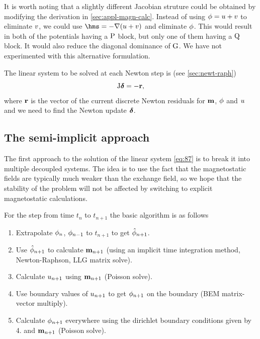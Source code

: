 It is worth noting that a slightly different Jacobian struture could be obtained by modifying the derivation in \cref{sec:appl-magn-calc}.
Instead of using $\phi = u + v$ to eliminate $v$, we could use $\hms = - \grad ( \phione + \phitwo)$ and eliminate $\phi$.
This would result in both of the potentials having a $\mathrm{P}$ block, but only one of them having a $\mathrm{Q}$ block.
It would also reduce the diagonal dominance of ${\mathbf{\mathrm{G}}}$.
We have not experimented with this alternative formulation.

The linear system to be solved at each Newton step is (see \cref{sec:newt-raph})
\begin{equation}
  \mathrm{J} \boldsymbol{\mathrm{\delta}} = -\boldsymbol{\mathrm{r}},
  \label{eq:87}
\end{equation}
where $\boldsymbol{\mathrm{r}}$ is the vector of the current discrete Newton residuals for $\boldsymbol{\mathrm{m}}$, $\phi$ and $u$ and we need to find the Newton update $\boldsymbol{\mathrm{\delta}}$.


\subsection{The semi-implicit approach}
\label{sec:semi-implicit-bem}

The first approach to the solution of the linear system \cref{eq:87} is to break it into multiple decoupled systems.
The idea is to use the fact that the magnetostatic fields are typically much weaker than the exchange field, so we hope that the stability of the problem will not be affected by switching to explicit magnetostatic calculations.


For the step from time $t_n$ to $t_{n+1}$ the basic algorithm is as follows 
\begin{enumerate}
\item Extrapolate $\phi_n$, $\phi_{n-1}$ to $t_{n+1}$ to get $\hat{\phi}_{n+1}$.
\item Use $\hat{\phi}_{n+1}$ to calculate $\boldsymbol{\mathrm{m}}_{n+1}$ (using an implicit time integration method, Newton-Raphson, LLG matrix solve).
\item Calculate $u_{n+1}$ using $\boldsymbol{\mathrm{m}}_{n+1}$ (Poisson solve).
\item Use boundary values of $u_{n+1}$ to get $\phi_{n+1}$ on the boundary (BEM matrix-vector multiply).
\item Calculate $\phi_{n+1}$ everywhere using the dirichlet boundary conditions given by 4. and $\boldsymbol{\mathrm{m}}_{n+1}$ (Poisson solve).
\end{enumerate}

